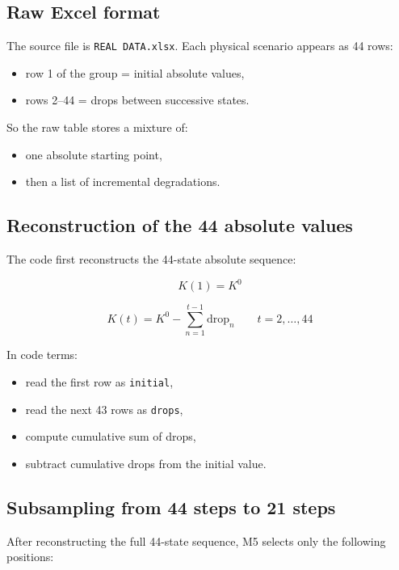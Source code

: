 \documentclass[11pt,a4paper]{article}
\begin{document}
\subsection*{Raw Excel format}
The source file is \texttt{REAL DATA.xlsx}. Each physical scenario appears as 44 rows:
\begin{itemize}[nosep]
    \item row 1 of the group = initial absolute values,
    \item rows 2--44 = drops between successive states.
\end{itemize}

So the raw table stores a mixture of:
\begin{itemize}[nosep]
    \item one absolute starting point,
    \item then a list of incremental degradations.
\end{itemize}

\subsection*{Reconstruction of the 44 absolute values}
The code first reconstructs the 44-state absolute sequence:

$$
K(1) = K^0
$$

$$
K(t) = K^0 - \sum_{n=1}^{t-1} \text{drop}_n \qquad t=2,\dots,44
$$

In code terms:
\begin{itemize}[nosep]
    \item read the first row as \texttt{initial},
    \item read the next 43 rows as \texttt{drops},
    \item compute cumulative sum of drops,
    \item subtract cumulative drops from the initial value.
\end{itemize}

\subsection*{Subsampling from 44 steps to 21 steps}
After reconstructing the full 44-state sequence, M5 selects only the following positions:
\end{document}
